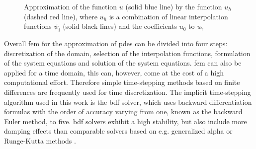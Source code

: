 \begin{figure}[H]
\centering
{}
\caption[Approximation of a function with FEM]{Approximation of the function $u$ (solid blue line) by the function $u_{h}$ (dashed red line), where $u_{h}$ is a combination of linear interpolation functions $\psi_{i}$ (solid black lines) and the coefficients $u_{0}$ to $u_{7}$ \cite{ComsolFEM}
\label{fig:FEM}
}
\end{figure}

Overall \gls{fem} for the approximation of \glspl{pde} can be divided into four steps: discretization of the domain, selection of the interpolation functions, formulation of the system equations and solution of the system equations. \newline 
\Gls{fem} can also be applied for a time domain, this can, however, come at the cost of a high computational effort. Therefore simple time-stepping methods based on finite differences are frequently used for time discretization. The implicit time-stepping algorithm used in this work is the \gls{bdf} solver, which uses backward differentiation formulas with the order of accuracy varying from one, known as the backward Euler method, to five. \gls{bdf} solvers exhibit a high stability, but also include more damping effects than comparable solvers based on e.g. generalized alpha or Runge-Kutta methods \cite{ComsolRefManual}.

